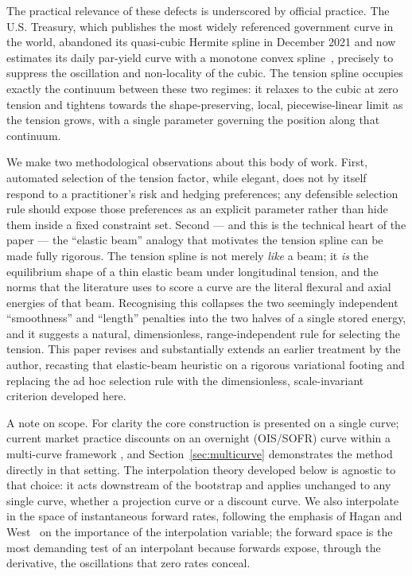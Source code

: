 \documentclass[10pt]{article}
\begin{document}
The practical relevance of these defects is underscored by official practice. The U.S.
Treasury, which publishes the most widely referenced government curve in the world, abandoned
its quasi-cubic Hermite spline in December 2021 and now estimates its daily par-yield curve
with a monotone convex spline~\cite{TreasuryMethod}, precisely to suppress the oscillation and
non-locality of the cubic. The tension spline occupies exactly the continuum between these two
regimes: it relaxes to the cubic at zero tension and tightens towards the shape-preserving,
local, piecewise-linear limit as the tension grows, with a single parameter governing the
position along that continuum.

We make two methodological observations about this body of work. First, automated selection
of the tension factor, while elegant, does not by itself respond to a practitioner's risk and
hedging preferences; any defensible selection rule should expose those preferences as an
explicit parameter rather than hide them inside a fixed constraint set. Second --- and this is
the technical heart of the paper --- the ``elastic beam'' analogy that motivates the tension
spline can be made fully rigorous. The tension spline is not merely \emph{like} a beam; it
\emph{is} the equilibrium shape of a thin elastic beam under longitudinal tension, and the
norms that the literature uses to score a curve are the literal flexural and axial energies of
that beam. Recognising this collapses the two seemingly independent ``smoothness'' and
``length'' penalties into the two halves of a single stored energy, and it suggests a natural,
dimensionless, range-independent rule for selecting the tension. This paper revises and
substantially extends an earlier treatment by the author, recasting that elastic-beam heuristic
on a rigorous variational footing and replacing the ad hoc selection rule with the
dimensionless, scale-invariant criterion developed here.

A note on scope. For clarity the core construction is presented on a single curve; current
market practice discounts on an overnight (OIS/SOFR) curve within a multi-curve framework
\cite{Bianchetti,Henrard}, and Section~\ref{sec:multicurve} demonstrates the method directly in
that setting. The interpolation theory developed below is agnostic to that choice: it acts
downstream of the bootstrap and applies unchanged to any single curve, whether a projection
curve or a discount curve. We also interpolate in the space of instantaneous forward rates, following the
emphasis of Hagan and West~\cite{Hagan} on the importance of the interpolation variable; the
forward space is the most demanding test of an interpolant because forwards expose, through the
derivative, the oscillations that zero rates conceal.
\end{document}
